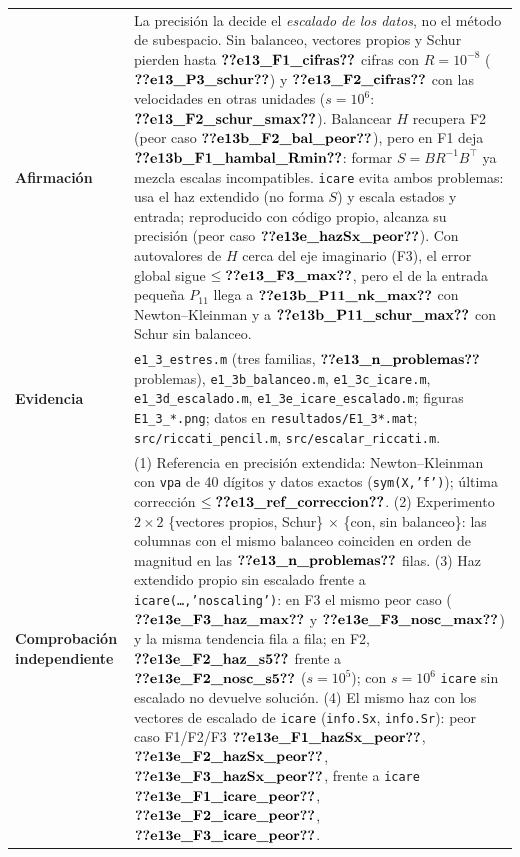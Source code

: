 \begin{recuadro}[title=Ficha de evidencia — E1.3: estudio de estrés numérico]
\begin{tabularx}{\linewidth}{@{}>{\bfseries}p{3.1cm} >{\raggedright\arraybackslash}X@{}}
Afirmación &
La precisión la decide el \emph{escalado de los datos}, no el método de subespacio. Sin balanceo,
vectores propios y Schur pierden hasta $\V{e13_F1_cifras}$ cifras con $R=10^{-8}$ ($\V{e13_P3_schur}$) y
$\V{e13_F2_cifras}$ con las velocidades en otras unidades ($s=10^{6}$: $\V{e13_F2_schur_smax}$). Balancear $H$
recupera F2 (peor caso $\V{e13b_F2_bal_peor}$), pero en F1 deja $\V{e13b_F1_hambal_Rmin}$: formar $S=BR^{-1}B^\top$
ya mezcla escalas incompatibles. \texttt{icare} evita ambos problemas: usa el haz extendido (no forma $S$) y
escala estados y entrada; reproducido con código propio, alcanza su precisión (peor caso
$\V{e13e_hazSx_peor}$). Con autovalores de $H$ cerca del eje imaginario (F3), el error global sigue
$\le\V{e13_F3_max}$, pero el de la entrada pequeña $P_{11}$ llega a $\V{e13b_P11_nk_max}$ con Newton--Kleinman
y a $\V{e13b_P11_schur_max}$ con Schur sin balanceo. \\[3pt]
Evidencia &
\texttt{e1\_3\_estres.m} (tres familias, $\V{e13_n_problemas}$ problemas), \texttt{e1\_3b\_balanceo.m}, \texttt{e1\_3c\_icare.m},
\texttt{e1\_3d\_escalado.m}, \texttt{e1\_3e\_icare\_escalado.m}; figuras \texttt{E1\_3\_*.png}; datos en
\texttt{resultados/E1\_3*.mat}; \texttt{src/riccati\_pencil.m}, \texttt{src/escalar\_riccati.m}. \\[3pt]
Comprobación independiente &
(1) Referencia en precisión extendida: Newton--Kleinman con \texttt{vpa} de 40 dígitos y datos exactos
(\texttt{sym(X,'f')}); última corrección $\le\V{e13_ref_correccion}$.
(2) Experimento $2\times2$ \{vectores propios, Schur\} $\times$ \{con, sin balanceo\}: las columnas con el
mismo balanceo coinciden en orden de magnitud en las $\V{e13_n_problemas}$ filas.
(3) Haz extendido propio sin escalado frente a \texttt{icare(\ldots,'noscaling')}: en F3 el mismo peor caso
($\V{e13e_F3_haz_max}$ y $\V{e13e_F3_nosc_max}$) y la misma tendencia fila a fila; en F2,
$\V{e13e_F2_haz_s5}$ frente a $\V{e13e_F2_nosc_s5}$ ($s=10^5$); con $s=10^6$ \texttt{icare} sin escalado no
devuelve solución.
(4) El mismo haz con los vectores de escalado de \texttt{icare} (\texttt{info.Sx}, \texttt{info.Sr}):
peor caso F1/F2/F3 $\V{e13e_F1_hazSx_peor}$, $\V{e13e_F2_hazSx_peor}$, $\V{e13e_F3_hazSx_peor}$, frente a
\texttt{icare} $\V{e13e_F1_icare_peor}$, $\V{e13e_F2_icare_peor}$, $\V{e13e_F3_icare_peor}$.

\end{tabularx}
\end{recuadro}
